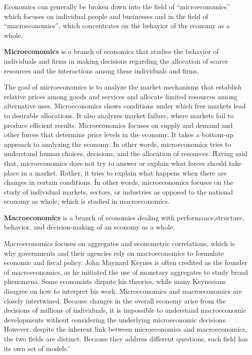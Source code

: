 Economics can generally be broken down into the field of ``microeconomics'' which focuses on individual people and
businesses and in the field of ``macroeconomics'', which concentrates on the behavior of the economy as a whole.

\bd[Microeconomics]
\textbf{Microeconomics} is a branch of economics that studies the behavior of individuals and firms in making
decisions regarding the allocation of scarce resources and the interactions among these individuals and firms.
\ed

The goal of microeconomics is to analyze the market mechanisms that establish relative prices among goods and
services and allocate limited resources among alternative uses. Microeconomics shows conditions under which free
markets lead to desirable allocations. It also analyzes market failure, where markets fail to produce efficient
results. \v

Microeconomics focuses on supply and demand and other forces that determine price levels in the economy. It takes a
bottom-up approach to analyzing the economy. In other words, microeconomics tries to understand human choices,
decisions, and the allocation of resources. \v

Having said that, microeconomics does not try to answer or explain what forces should take place in a market. Rather,
it tries to explain what happens when there are changes in certain conditions. \v

In other words, microeconomics focuses on the study of individual markets, sectors, or industries as opposed to the
national economy as whole, which is studied in macroeconomics.

\bd[Macroeconomics]
\textbf{Macroeconomics} is a branch of economics dealing with performance,structure, behavior, and decision-making of an
economy as a whole.
\ed

Macroeconomics focuses on aggregates and econometric correlations, which is why governments and their agencies rely
on macroeconomics to formulate economic and fiscal policy. John Maynard Keynes is often credited as the founder of
macroeconomics, as he initiated the use of monetary aggregates to study broad phenomena. Some economists dispute his
theories, while many Keynesians disagree on how to interpret his work. \v

Microeconomics and macroeconomics are closely intertwined. Because changes in the overall economy arise from the
decisions of millions of individuals, it is impossible to understand macroeconomic developments without considering
the underlying microeconomic decisions. However, despite the inherent link between microeconomics and macroeconomics,
the two fields are distinct. Because they address different questions, each field has its own set of models. \v

